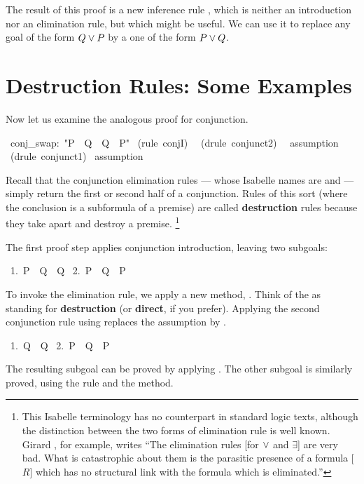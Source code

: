 The result of this proof is a new inference rule , which is neither 
an introduction nor an elimination rule, but which might 
be useful.  We can use it to replace any goal of the form $Q\vee P$
by a one of the form $P\vee Q$.%


\section{Destruction Rules: Some Examples}

%
Now let us examine the analogous proof for conjunction. 
\begin{isabelle}
\ conj_swap:\ "P\ \isasymand\ Q\ \isasymLongrightarrow\ Q\ \isasymand\ P"\isanewline
{}\ (rule\ conjI)\isanewline
\ \ (drule\ conjunct2)\isanewline
\ \ assumption\isanewline
{}\ (drule\ conjunct1)\isanewline
{}\ assumption
\end{isabelle}
Recall that the conjunction elimination rules --- whose Isabelle names are 
 and  --- simply return the first or second half
of a conjunction.  Rules of this sort (where the conclusion is a subformula of a
premise) are called \textbf{destruction} rules because they take apart and destroy
a premise.%
\footnote{This Isabelle terminology has no counterpart in standard logic texts, 
although the distinction between the two forms of elimination rule is well known. 
Girard \cite[page 74]{girard89},
for example, writes ``The elimination rules 
[for $\vee$ and $\exists$] are very
bad.  What is catastrophic about them is the parasitic presence of a formula [$R$]
which has no structural link with the formula which is eliminated.''}

The first proof step applies conjunction introduction, leaving 
two subgoals: 
\begin{isabelle}
\ 1.\ P\ \isasymand\ Q\ \isasymLongrightarrow\ Q\isanewline
\ 2.\ P\ \isasymand\ Q\ \isasymLongrightarrow\ P
\end{isabelle}

To invoke the elimination rule, we apply a new method, . 
Think of the  as standing for \textbf{destruction} (or \textbf{direct}, if
you prefer).   Applying the 
second conjunction rule using  replaces the assumption 
 by . 
\begin{isabelle}
\ 1.\ Q\ \isasymLongrightarrow\ Q\isanewline
\ 2.\ P\ \isasymand\ Q\ \isasymLongrightarrow\ P
\end{isabelle}
The resulting subgoal can be proved by applying .
The other subgoal is similarly proved, using the  rule and the 
 method.

